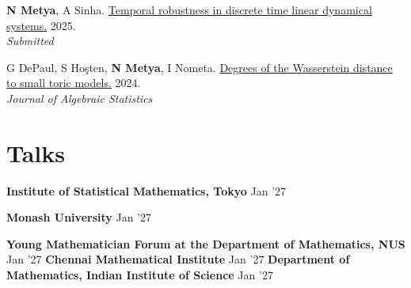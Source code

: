 \begin{etaremune}[leftmargin=13pt]
\item {\color{grey}\textbf{N Metya}, A Sinha}. \href{https://arxiv.org/abs/2505.02347}{Temporal robustness in discrete time linear dynamical systems.} 2025. \\
\textit{Submitted}\vspace{-5pt}


\item {\footnotemark[\value{footnote}]\color{grey}G DePaul, S Ho\c{s}ten, \textbf{N Metya}, I Nometa}. \href{https://arxiv.org/abs/2402.09626}{Degrees of the Wasserstein distance to small toric models.} 2024. \\
\textit{Journal of Algebraic Statistics} 
\end{etaremune}

\vspace{-15pt}

\section{Talks}
\resumeSubHeadingListStart

\resumeProjectHeading
{\textbf{Institute of Statistical Mathematics, Tokyo}}
{\color{grey}Jan '27}
{\resumeItemListStart
{}
\resumeItemListEnd}
\vspace{\gap}


\resumeProjectHeading
{\textbf{Monash University}}
{\color{grey}Jan '27}
{\resumeItemListStart
{}
\resumeItemListEnd}
\vspace{\gap}

\resumeProjectHeading
{\textbf{Young Mathematician Forum at the Department of Mathematics, NUS}}
{\color{grey}Jan '27}
{\resumeItemListStart
{}
\resumeItemListEnd}
\vspace{\gap}
\resumeProjectHeading
{\textbf{Chennai Mathematical Institute}}
{\color{grey}Jan '27}
{\resumeItemListStart
{}
\resumeItemListEnd}
\vspace{\gap}
\resumeProjectHeading
{\textbf{Department of Mathematics, Indian Institute of Science}}
{\color{grey}Jan '27}
{\resumeItemListStart
{}
\resumeItemListEnd}
\vspace{\gap}

